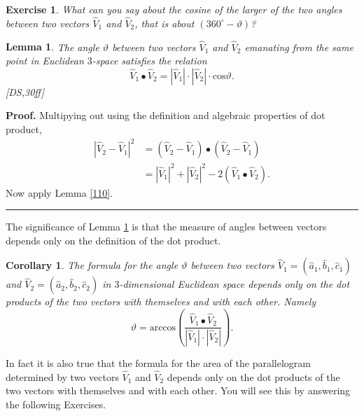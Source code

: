 \documentclass{article}%
\newtheorem{corollary}[theorem]{Corollary}
\newtheorem{exercise}[theorem]{Exercise}
\newtheorem{lemma}[theorem]{Lemma}
\newenvironment{proof}[1][Proof]{\noindent\textbf{#1.} }{\ \rule{0.5em}{0.5em}}
\begin{document}
\begin{exercise}
What can you say about the cosine of the larger of the two angles between two
vectors $\hat{V}_{1}$ and $\hat{V}_{2}$, that is about $\left(  360^{\circ
}-\vartheta\right)  $?
\end{exercise}

\begin{lemma}
\label{111}The angle $\vartheta$ between two vectors $\hat{V}_{1}$ and
$\hat{V}_{2}$ emanating from the same point in Euclidean $3$-space satisfies
the relation
\begin{equation}
\hat{V}_{1}\bullet\hat{V}_{2}=\left\vert \hat{V}_{1}\right\vert \cdot
\left\vert \hat{V}_{2}\right\vert \cdot\mathrm{cos}\vartheta. \label{2}%
\end{equation}
[DS,30ff]
\end{lemma}

\begin{proof}
Multipying out using the definition and algebraic properties of dot product,%
\begin{align*}
\left\vert \hat{V}_{2}-\hat{V}_{1}\right\vert ^{2}  &  =\left(  \hat{V}%
_{2}-\hat{V}_{1}\right)  \bullet\left(  \hat{V}_{2}-\hat{V}_{1}\right) \\
&  =\left\vert \hat{V}_{1}\right\vert ^{2}+\left\vert \hat{V}_{2}\right\vert
^{2}-2\left(  \hat{V}_{1}\bullet\hat{V}_{2}\right)  .
\end{align*}
Now apply Lemma \ref{110}.
\end{proof}

The significance of Lemma \ref{111} is that the measure of angles between
vectors depends only on the definition of the dot product.

\begin{corollary}
The formula for the angle $\vartheta$ between two vectors $\hat{V}_{1}=\left(
\hat{a}_{1},\hat{b}_{1},\hat{c}_{1}\right)  $ and $\hat{V}_{2}=\left(  \hat
{a}_{2},\hat{b}_{2},\hat{c}_{2}\right)  $ in $3$-dimensional Euclidean space
depends only on the dot products of the two vectors with themselves and with
each other. Namely%
\[
\vartheta=\mathrm{arccos}\left(  \frac{\hat{V}_{1}\bullet\hat{V}_{2}%
}{\left\vert \hat{V}_{1}\right\vert \cdot\left\vert \hat{V}_{2}\right\vert
}\right)  .
\]

\end{corollary}

In fact it is also true that the formula for the area of the parallelogram
determined by two vectors $\hat{V}_{1}$ and $\hat{V}_{2}$ depends only on the
dot products of the two vectors with themselves and with each other. You will
see this by answering the following Exercises.
\end{document}
